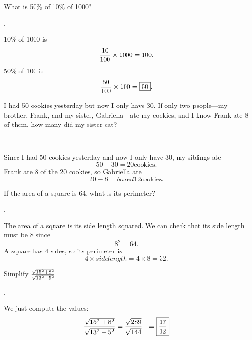 \documentclass[11pt]{article}
\DeclareRobustCommand{\frac}[3][0pt]{%
  {\begingroup\hspace{#1}#2\hspace{#1}\endgroup\over\hspace{#1}#3\hspace{#1}}}
\begin{document}

\begin{problem}
What is 50\% of 10\% of 1000?
\end{problem}
\begin{answer}
.
\end{answer}
\begin{solution}
10\% of 1000 is
$$\frac{10}{100} \times 1000 = 100.$$
50\% of 100 is
$$\frac{50}{100} \times 100 = \boxed{50}.$$
\end{solution}

\begin{problem}
I had 50 cookies yesterday but now I only have 30. If only two people---my brother, Frank, and my sister, Gabriella---ate my cookies, and I know Frank ate 8 of them, how many did my sister eat?
\end{problem}
\begin{answer}
.
\end{answer}
\begin{solution}
Since I had 50 cookies yesterday and now I only have 30, my siblings ate
$$50-30 = 20 \text{cookies}.$$
Frank ate 8 of the 20 cookies, so Gabriella ate
$$20-8=boxed{12} \text{cookies}.$$
\end{solution}

\begin{problem}
If the area of a square is 64, what is its perimeter?
\end{problem}
\begin{answer}
.
\end{answer}
\begin{solution}
The area of a square is its side length squared. We can check that its side length must be 8 since
$$8^2 = 64.$$
A square has 4 sides, so its perimeter is
$$4 \times {side length} = 4 \times 8 = \boxed{32}.$$
\end{solution}


\begin{problem}
Simplify $\frac{\sqrt{15^2+8^2}}{\sqrt{13^2-5^2}}$
\end{problem}
\begin{answer}
 \boxed{\frac{17}{12}}.
\end{answer}
\begin{solution}
We just compute the values:
\begin{align*}
\frac{\sqrt{15^2+8^2}}{\sqrt{13^2-5^2}} &= \frac{\sqrt{289}}{\sqrt{144}}
                    	&= \boxed{\frac{17}{12}}
\end{align*}
\end{solution}
\end{document}
